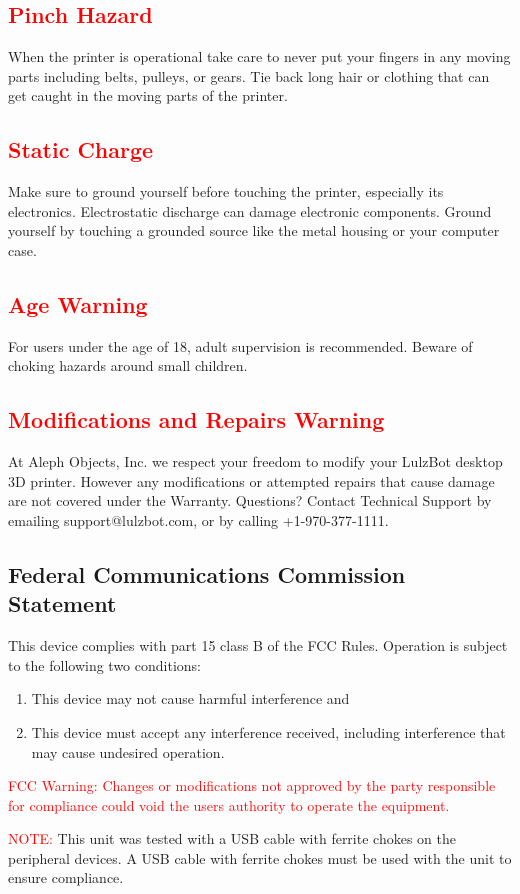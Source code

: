 \subsection{\textcolor{red}{Pinch Hazard}}

When the printer is operational take care to never put your fingers in any moving parts including belts, pulleys, or gears. Tie back long hair or clothing that can get caught in the moving parts of the printer.

\subsection{\textcolor{red}{Static Charge}}
Make sure to ground yourself before touching the printer, especially its electronics. Electrostatic discharge can damage electronic components. Ground yourself by touching a grounded source like the metal housing or your computer case.

\subsection{\textcolor{red}{Age Warning}}

For users under the age of 18, adult supervision is recommended. Beware of choking hazards around small children.

\subsection{\textcolor{red}{Modifications and Repairs Warning}}

At Aleph Objects, Inc.\textsuperscript{\miniscule{\textregistered}} we respect your freedom to modify your LulzBot\textsuperscript{\miniscule{\texttrademark}} desktop 3D printer. However any modifications or attempted repairs that cause damage are not covered under the Warranty. Questions? Contact Technical Support by emailing support@lulzbot.com, or by calling +1-970-377-1111.

\subsection{Federal Communications Commission Statement}
This device complies with part 15 class B of the FCC Rules. Operation is subject to the following two conditions:
\begin{enumerate}
\item This device may not cause harmful interference and
\item This device must accept any interference received, including interference that may cause undesired operation.
\end{enumerate}

\textcolor{red}{FCC Warning:}
\textcolor{red}{Changes or modifications not approved by the party responsible for compliance could void the users authority to operate the equipment.}

\textcolor{red}{NOTE:} This unit was tested with a USB cable with ferrite chokes on the peripheral devices. A USB cable with ferrite chokes must be used with the unit to ensure compliance.


